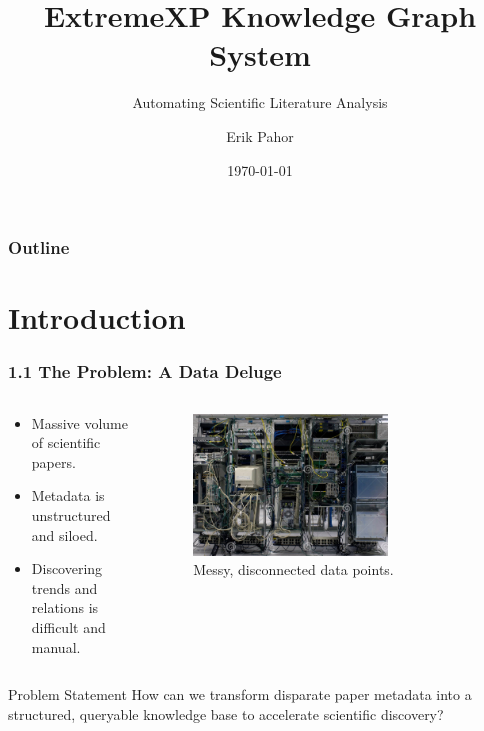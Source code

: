 \documentclass{beamer}
\title{ExtremeXP Knowledge Graph System}
\subtitle{Automating Scientific Literature Analysis}
\author{Erik Pahor}
\date{\today}
\institute{Project Presentation}
\begin{document}
\begin{frame}
    \titlepage
\end{frame}

\begin{frame}
    \frametitle{Outline}
    \tableofcontents
\end{frame}

\section{Introduction}

\begin{frame}
    \frametitle{1.1 The Problem: A Data Deluge}

    \begin{columns}[T]
        \begin{column}{0.4\textwidth}
            \begin{itemize}
                \item<1-> Massive volume of scientific papers.
                \pause
                \item<2-> Metadata is unstructured and siloed.
                \pause
                \item<3-> Discovering trends and relations is difficult and manual.
            \end{itemize}
        \end{column}
        \begin{column}{0.6\textwidth}
            \begin{figure}
                \includegraphics[width=0.7\textwidth]{messy.png}
                \caption{Messy, disconnected data points.}
            \end{figure}
        \end{column}
    \end{columns}

    \begin{alertblock}{Problem Statement}
        \centering How can we transform disparate paper metadata into a structured, queryable knowledge base to accelerate scientific discovery?
    \end{alertblock}
\end{frame}
\end{document}
